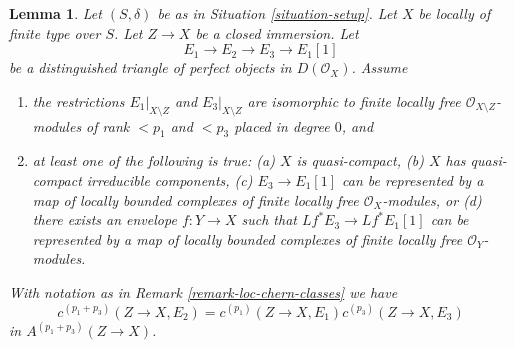 \documentclass{amsart}
\theoremstyle{plain}
\newtheorem{lemma}[subsection]{Lemma}
\theoremstyle{definition}
\theoremstyle{remark}
\numberwithin{equation}{subsection}
\begin{document}
\begin{lemma}
\label{lemma-additivity-loc-chern-c}
Let $(S, \delta)$ be as in Situation \ref{situation-setup}.
Let $X$ be locally of finite type over $S$. Let $Z \to X$ be
a closed immersion. Let
$$
E_1 \to E_2 \to E_3 \to E_1[1]
$$
be a distinguished triangle of perfect objects in $D(\mathcal{O}_X)$.
Assume
\begin{enumerate}
\item the restrictions $E_1|_{X \setminus Z}$ and $E_3|_{X \setminus Z}$
are isomorphic to finite locally free $\mathcal{O}_{X \setminus Z}$-modules
of rank $< p_1$ and $< p_3$ placed in degree $0$, and
\item at least one of the following is true:
(a) $X$ is quasi-compact,
(b) $X$ has quasi-compact irreducible components,
(c) $E_3 \to E_1[1]$ can be represented by a map of locally
bounded complexes of finite locally free $\mathcal{O}_X$-modules, or
(d) there exists an envelope $f : Y \to X$ such that $Lf^*E_3 \to Lf^*E_1[1]$
can be represented by a map of locally bounded complexes of
finite locally free $\mathcal{O}_Y$-modules.
\end{enumerate}
With notation as in Remark \ref{remark-loc-chern-classes} we have
$$
c^{(p_1 + p_3)}(Z \to X, E_2) = c^{(p_1)}(Z \to X, E_1)c^{(p_3)}(Z \to X, E_3)
$$
in $A^{(p_1 + p_3)}(Z \to X)$.
\end{lemma}
\end{document}

